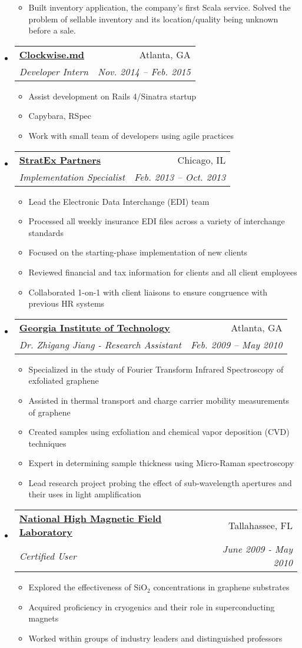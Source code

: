 \documentclass[letterpaper,11pt]{article}
\makeatletter
\newcommand{\resitem}[1]{\item #1 \vspace{-2pt}}
\newcommand{\ressubheading}[4]{
\begin{tabular*}{6.5in}{l@{\extracolsep{\fill}}r}
		\textbf{#1} & #2 \\
		\textit{#3} & \textit{#4} \\
\end{tabular*}\vspace{-6pt}}
\makeatother
\begin{document}
\begin{itemize}
{\begin{itemize}
{        A self-contained team, where each developer was responsible for the
        entire stack, including CI and deployment.}
        \resitem{Built inventory application, the company's first Scala
        service. Solved the problem of sellable inventory and its
        location/quality being unknown before a sale.}
    \end{itemize}
    }
\item
\ressubheading{\href{http://www.clockwise.md/}{Clockwise.md}}{Atlanta, GA}{Developer Intern}{Nov. 2014 -- Feb. 2015}
    { \footnotesize
    \begin{itemize}
        \resitem{Assist development on Rails 4/Sinatra startup}
        \resitem{Capybara, RSpec}
        \resitem{Work with small team of developers using agile practices}
    \end{itemize}
    }
\item
  \ressubheading{\href{http://www.stratexpartners.com/}{StratEx Partners}}{Chicago, IL}{Implementation Specialist}{Feb. 2013 -- Oct. 2013}
    { \footnotesize
    \begin{itemize}
        \resitem{Lead the Electronic Data Interchange (EDI) team}
        \resitem{Processed all weekly insurance EDI files across a variety of interchange standards}
        \resitem{Focused on the starting-phase implementation of new clients}
        \resitem{Reviewed financial and tax information for clients and all client employees}
        \resitem{Collaborated 1-on-1 with client liaisons to ensure congruence with previous HR systems}
    \end{itemize}
    }

  \item
    \ressubheading{\href{http://phweb.physics.gatech.edu/research/jiang/members.html}{Georgia Institute of Technology}}{Atlanta, GA}{Dr. Zhigang Jiang - Research Assistant}{Feb. 2009 -- May 2010}
    { \footnotesize
    \begin{itemize}
        \resitem{Specialized in the study of Fourier Transform Infrared Spectroscopy of exfoliated graphene}
        \resitem{Assisted in thermal transport and charge carrier mobility measurements of graphene}
        \resitem{Created samples using exfoliation and chemical vapor deposition (CVD) techniques}
        \resitem{Expert in determining sample thickness using Micro-Raman spectroscopy}
        \resitem{Lead research project probing the effect of sub-wavelength apertures and their uses in light amplification}
    \end{itemize}
    }
  \item
    \ressubheading{\href{http://www.magnet.fsu.edu/}{National High Magnetic Field Laboratory}}{Tallahassee, FL}{Certified User}{June 2009 - May 2010}
    { \footnotesize
    \begin{itemize}
        \resitem{Explored the effectiveness of SiO$_{2}$ concentrations in graphene substrates}
        \resitem{Acquired proficiency in cryogenics and their role in superconducting magnets}
        \resitem{Worked within groups of industry leaders and distinguished professors}
    \end{itemize}
    }
\end{itemize}
\end{document}
